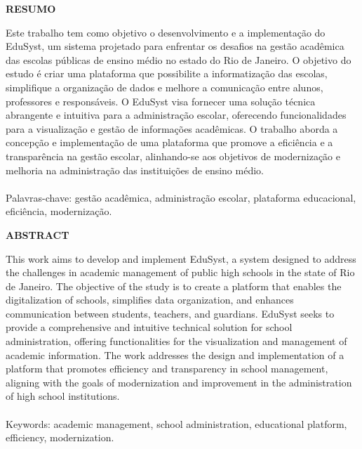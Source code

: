 \documentclass[main.tex]{subfiles}
\begin{document}
\begin{titlepage}
\begin{center}
    \large
    \textbf{\MakeUppercase{Resumo}}
\end{center}

Este trabalho tem como objetivo o desenvolvimento e a implementação do EduSyst, um sistema projetado para enfrentar os desafios na gestão acadêmica das escolas públicas de ensino médio no estado do Rio de Janeiro. O objetivo do estudo é criar uma plataforma que possibilite a informatização das escolas, simplifique a organização de dados e melhore a comunicação entre alunos, professores e responsáveis. O EduSyst visa fornecer uma solução técnica abrangente e intuitiva para a administração escolar, oferecendo funcionalidades para a visualização e gestão de informações acadêmicas. O trabalho aborda a concepção e implementação de uma plataforma que promove a eficiência e a transparência na gestão escolar, alinhando-se aos objetivos de modernização e melhoria na administração das instituições de ensino médio.
\\
\\
Palavras-chave: gestão acadêmica, administração escolar, plataforma educacional, eficiência, modernização.
\end{titlepage}

\begin{titlepage}
\begin{center}
    \large
    \textbf{\MakeUppercase{Abstract}}
\end{center}

This work aims to develop and implement EduSyst, a system designed to address the challenges in academic management of public high schools in the state of Rio de Janeiro. The objective of the study is to create a platform that enables the digitalization of schools, simplifies data organization, and enhances communication between students, teachers, and guardians. EduSyst seeks to provide a comprehensive and intuitive technical solution for school administration, offering functionalities for the visualization and management of academic information. The work addresses the design and implementation of a platform that promotes efficiency and transparency in school management, aligning with the goals of modernization and improvement in the administration of high school institutions.
\\
\\
Keywords: academic management, school administration, educational platform, efficiency, modernization.
\end{titlepage}
\end{document}
